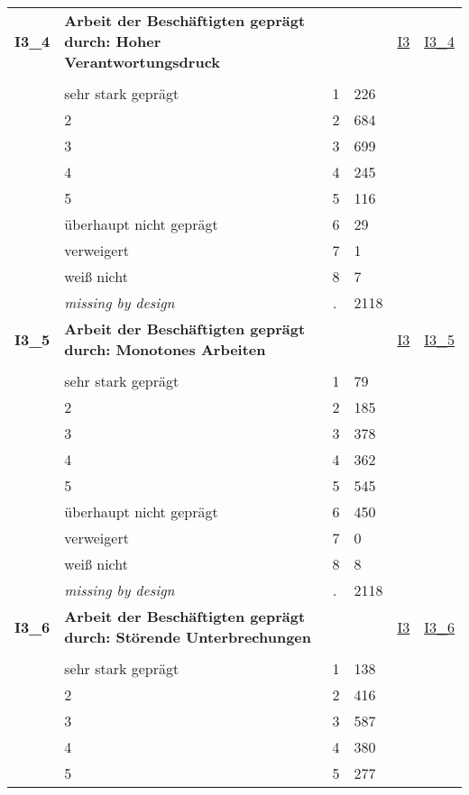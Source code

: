 \begin{longtable}{| L{2.45cm} | L{6cm} | C{1.5cm} | R{1cm} | C{2.25cm} | C{2.25cm} |}
   \midrule
\textbf{I3\_4}\label{var:I3:4} & \textbf{Arbeit der Beschäftigten geprägt durch: Hoher Verantwortungsdruck} &  &  & \hyperref[I3]{I3} & \hyperref[var:suf:I3:4]{I3\_4} \\ 
   &  &  &  &  &  \\ 
   & sehr stark geprägt & 1 & 226 &  &  \\ 
   & 2 & 2 & 684 &  &  \\ 
   & 3 & 3 & 699 &  &  \\ 
   & 4 & 4 & 245 &  &  \\ 
   & 5 & 5 & 116 &  &  \\ 
   & überhaupt nicht geprägt & 6 & 29 &  &  \\ 
   & verweigert & 7 & 1 &  &  \\ 
   & weiß nicht & 8 & 7 &  &  \\ 
   & \textit{missing by design} & \textit{.} & 2118 &  &  \\ 
   \midrule
\textbf{I3\_5}\label{var:I3:5} & \textbf{Arbeit der Beschäftigten geprägt durch: Monotones Arbeiten} &  &  & \hyperref[I3]{I3} & \hyperref[var:suf:I3:5]{I3\_5} \\ 
   &  &  &  &  &  \\ 
   & sehr stark geprägt & 1 & 79 &  &  \\ 
   & 2 & 2 & 185 &  &  \\ 
   & 3 & 3 & 378 &  &  \\ 
   & 4 & 4 & 362 &  &  \\ 
   & 5 & 5 & 545 &  &  \\ 
   & überhaupt nicht geprägt & 6 & 450 &  &  \\ 
   & verweigert & 7 & 0 &  &  \\ 
   & weiß nicht & 8 & 8 &  &  \\ 
   & \textit{missing by design} & \textit{.} & 2118 &  &  \\ 
   \midrule
\textbf{I3\_6}\label{var:I3:6} & \textbf{Arbeit der Beschäftigten geprägt durch: Störende Unterbrechungen} &  &  & \hyperref[I3]{I3} & \hyperref[var:suf:I3:6]{I3\_6} \\ 
   &  &  &  &  &  \\ 
   & sehr stark geprägt & 1 & 138 &  &  \\ 
   & 2 & 2 & 416 &  &  \\ 
   & 3 & 3 & 587 &  &  \\ 
   & 4 & 4 & 380 &  &  \\ 
   & 5 & 5 & 277 &  &  \\ 

\end{longtable}
